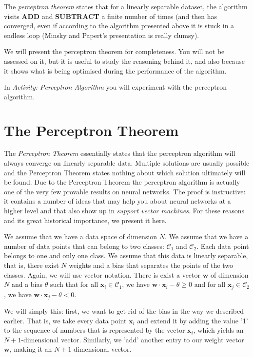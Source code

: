 The \emph{perceptron theorem} states that for a linearly separable dataset, the algorithm visits {\bf ADD } and {\bf SUBTRACT} a finite number of times (and then
has converged, even if according to the algorithm presented above it is stuck in a endless loop (Minsky and Papert's presentation is really clumsy).

We will present the perceptron theorem for completeness. You will not be assessed on it, but it is useful to study the reasoning behind it, and also
because it shows what is being optimised during the performance of the algorithm.

In \emph{Activity: Perceptron Algorithm} you will experiment with the perceptron algorithm.





\section{The Perceptron Theorem}
 The \emph{Perceptron Theorem} essentially states that the perceptron algorithm will always converge on linearly separable data.
Multiple solutions are usually possible and the Perceptron Theorem states nothing about which solution ultimately will be found. Due to the Perceptron Theorem
the perceptron algorithm is actually one of the very few provable results on neural networks. The proof is instructive: it contains a number of ideas that may help
you about neural networks at a higher level and that also show up in \emph{support vector machines}. For these reasons and its great historical importance, we present it here.

We assume that we have a data space of dimension $N$. We assume that we have a number of data points that can belong to two classes: $\mathcal{C}_1$ and $\mathcal{C}_2$.
Each data point belongs to one and only one class. We assume that this data is linearly separable, that is, there exist $N$ weights and a bias that separates the
points of the two classes. Again, we will use vector notation. There is exist a vector $\boldsymbol{w}$ of dimension $N$ and a bias $\theta$ such that for all
$\boldsymbol{x}_i \in \mathcal{C}_1$, we have $\boldsymbol{w} \cdot \boldsymbol{x}_i - \theta \ge 0$ and for all $\boldsymbol{x}_j \in \mathcal{C}_2$, we have
$\boldsymbol{w} \cdot \boldsymbol{x}_j - \theta < 0$.

We will simply this: first, we want to get rid of the bias in the way we described earlier. That is, we take every data point $\boldsymbol{x}_i$ and extend it
by adding the value '1' to the sequence of numbers that is represented by the vector $\boldsymbol{x}_i$, which yields an $N+1$-dimensional vector. Similarly,
we 'add' another entry to our weight vector $\boldsymbol{w}$, making it an $N+1$ dimensional vector.

